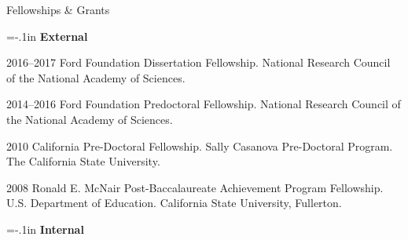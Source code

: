 \begin{rSection}{Fellowships \& Grants}
\noindent \vspace*{-1.5em}

{\parindent=-.1in {\bf External}}

\begin{hangt}{2016--2017}
Ford Foundation Dissertation Fellowship. National Research Council of the National Academy of Sciences. %
\end{hangt}
\begin{hangt}{2014--2016}
Ford Foundation Predoctoral Fellowship. National Research Council of the National Academy of Sciences. %
\end{hangt}
\begin{hangt}{2010 \datefill}
California Pre-Doctoral Fellowship. Sally Casanova Pre-Doctoral Program. The California State University. %
\end{hangt}
\begin{hangt}{2008 \datefill}
Ronald E. McNair Post-Baccalaureate Achievement Program Fellowship. U.S. Department of Education. California State University, Fullerton.
\end{hangt}

{\parindent=-.1in {\bf Internal}}


\end{rSection}
